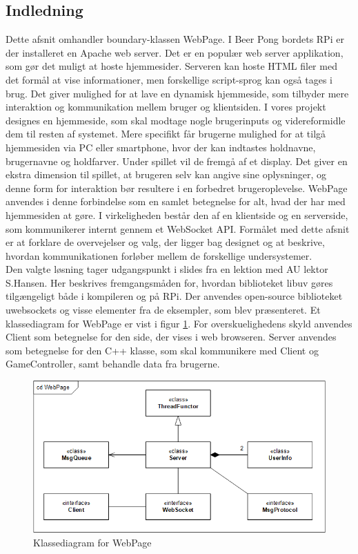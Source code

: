 \documentclass[Softwaredesign/Softwaredesign_main.tex]{subfiles}
\begin{document}
\subsection{Indledning}
Dette afsnit omhandler boundary-klassen WebPage. I Beer Pong bordets RPi er der installeret en Apache web server. Det er en populær web server applikation, som gør det muligt at hoste hjemmesider.\cite{apache_web_server} Serveren kan hoste HTML filer med det formål at vise informationer, men forskellige script-sprog kan også tages i brug. Det giver mulighed for at lave en dynamisk hjemmeside, som tilbyder mere interaktion og kommunikation mellem bruger og klientsiden. I vores projekt designes en hjemmeside, som skal modtage nogle brugerinputs og videreformidle dem til resten af systemet. Mere specifikt får brugerne mulighed for at tilgå hjemmesiden via PC eller smartphone, hvor der kan indtastes holdnavne, brugernavne og holdfarver. Under spillet vil de fremgå af et display. Det giver en ekstra dimension til spillet, at brugeren selv kan angive sine oplysninger, og denne form for interaktion bør resultere i en forbedret brugeroplevelse. WebPage anvendes i denne forbindelse som en samlet betegnelse for alt, hvad der har med hjemmesiden at gøre. I virkeligheden består den af en klientside og en serverside, som kommunikerer internt gennem et WebSocket API. Formålet med dette afsnit er at forklare de overvejelser og valg, der ligger bag designet og at beskrive, hvordan kommunikationen forløber mellem de forskellige undersystemer. \\Den valgte løsning tager udgangspunkt i slides\cite{websockets_getting_started} fra en lektion med AU lektor S.Hansen. Her beskrives fremgangsmåden for, hvordan biblioteket libuv gøres tilgængeligt både i kompileren og på RPi. Der anvendes open-source biblioteket uwebsockets\cite{uwebsockets_repo} og visse elementer fra de eksempler, som blev præsenteret.
Et klassediagram for WebPage er vist i figur \ref{fig:WebPage_cd}. For overskuelighedens skyld anvendes Client som betegnelse for den side, der vises i web browseren. Server anvendes som betegnelse for den C++ klasse, som skal kommunikere med Client og GameController, samt behandle data fra brugerne. 

\begin{figure}[H]
    \centering
    \includegraphics[width=1\textwidth]{Softwaredesign/RPiApp/graphic_RPi/cd_WebPage.png}
    \caption{Klassediagram for WebPage}
    \label{fig:WebPage_cd}
\end{figure}
\end{document}
